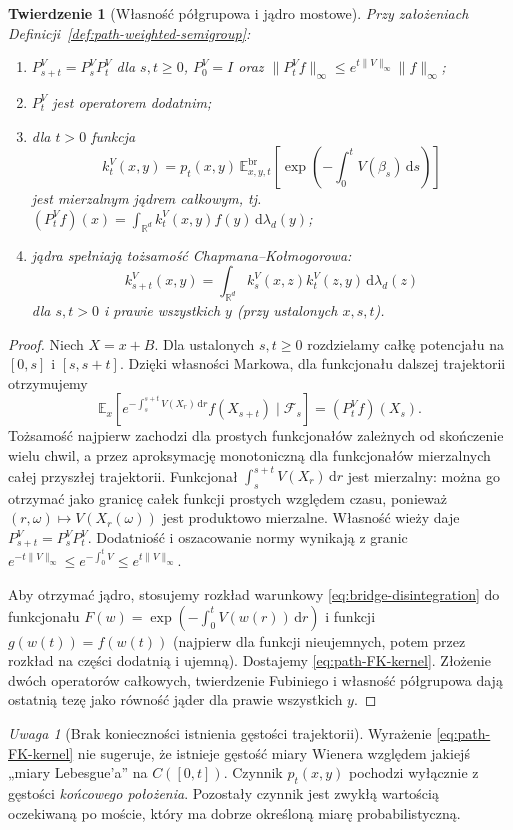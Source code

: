 \documentclass[11pt,a4paper,oneside]{report}
\numberwithin{equation}{chapter}
\theoremstyle{plain}
\newtheorem{twierdzenie}{Twierdzenie}[chapter]
\theoremstyle{definition}
\theoremstyle{remark}
\newtheorem{uwaga}{Uwaga}[chapter]
\newcommand{\R}{\mathbb{R}}
\newcommand{\E}{\mathbb{E}}
\newcommand{\calF}{\mathcal{F}}
\newcommand{\dd}{\mathrm{d}}
\begin{document}
\begin{twierdzenie}[Własność półgrupowa i jądro mostowe]\label{thm:volIII:15:06}
\label{th:path-FK-kernel}
Przy założeniach Definicji~\ref{def:path-weighted-semigroup}:
\begin{enumerate}
\item $P_{s+t}^V=P_s^VP_t^V$ dla $s,t\ge0$,
$P_0^V=I$ oraz
$\|P_t^V f\|_\infty\le e^{t\|V\|_\infty}\|f\|_\infty$;
\item $P_t^V$ jest operatorem dodatnim;
\item dla $t>0$ funkcja
\[
 k_t^V(x,y)=p_t(x,y)\,
 \E_{x,y,t}^{\mathrm{br}}\left[
   \exp\left(-\int_0^tV(\beta_s)\,\dd s\right)\right]
 \tag{15.9}\label{eq:path-FK-kernel}
\]
jest mierzalnym jądrem całkowym, tj.
$(P_t^Vf)(x)=\int_{\R^d}k_t^V(x,y)f(y)\,\dd\lambda_d(y)$;
\item jądra spełniają tożsamość Chapmana--Kołmogorowa:
\[
 k_{s+t}^V(x,y)=\int_{\R^d}k_s^V(x,z)k_t^V(z,y)
 \,\dd\lambda_d(z)
\]
dla $s,t>0$ i prawie wszystkich $y$
(przy ustalonych $x,s,t$).
\end{enumerate}
\end{twierdzenie}
\begin{proof}
Niech $X=x+B$. Dla ustalonych $s,t\ge0$ rozdzielamy
całkę potencjału na $[0,s]$ i $[s,s+t]$. Dzięki własności
Markowa, dla funkcjonału dalszej trajektorii otrzymujemy
\[
 \E_x\left[e^{-\int_s^{s+t}V(X_r)\,\dd r}
    f(X_{s+t})\mid\calF_s\right]=(P_t^V f)(X_s).
\]
Tożsamość najpierw zachodzi dla prostych funkcjonałów
zależnych od skończenie wielu chwil, a przez aproksymację
monotoniczną dla funkcjonałów mierzalnych całej przyszłej
trajektorii. Funkcjonał $\int_s^{s+t}V(X_r)\,\dd r$
jest mierzalny: można go otrzymać jako granicę całek
funkcji prostych względem czasu, ponieważ
$(r,\omega)\mapsto V(X_r(\omega))$ jest produktowo
mierzalne. Własność wieży daje $P_{s+t}^V=P_s^VP_t^V$.
Dodatniość i oszacowanie normy wynikają z granic
$e^{-t\|V\|_\infty}\le e^{-\int_0^tV}\le e^{t\|V\|_\infty}$.

Aby otrzymać jądro, stosujemy rozkład warunkowy
\eqref{eq:bridge-disintegration} do funkcjonału
$F(w)=\exp(-\int_0^tV(w(r))\,\dd r)$
i funkcji $g(w(t))=f(w(t))$ (najpierw dla funkcji
nieujemnych, potem przez rozkład na części dodatnią
i ujemną). Dostajemy \eqref{eq:path-FK-kernel}.
Złożenie dwóch operatorów całkowych, twierdzenie
Fubiniego i własność półgrupowa dają ostatnią tezę
jako równość jąder dla prawie wszystkich $y$.
\end{proof}

\begin{uwaga}[Brak konieczności istnienia gęstości trajektorii]
Wyrażenie \eqref{eq:path-FK-kernel} nie sugeruje, że
istnieje gęstość miary Wienera względem jakiejś
„miary Lebesgue'a” na $C([0,t])$. Czynnik $p_t(x,y)$
pochodzi wyłącznie z gęstości \emph{końcowego położenia}.
Pozostały czynnik jest zwykłą wartością oczekiwaną po
moście, który ma dobrze określoną miarę probabilistyczną.
\end{uwaga}
\end{document}
